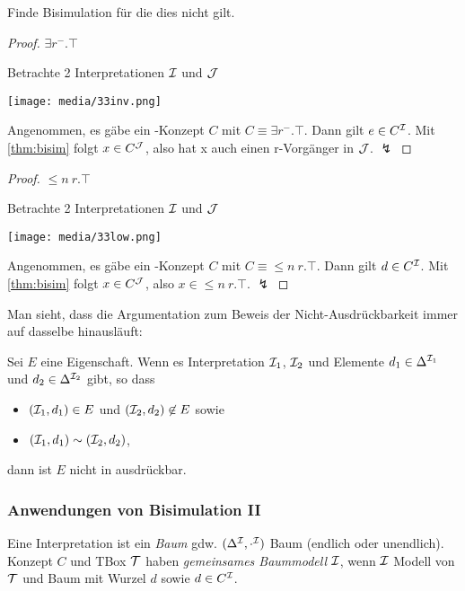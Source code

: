 \begin{tafel}[Beweisskizze] Finde Bisimulation für die dies nicht gilt.

\begin{proof} $\exists r^{-}.\top$

 Betrachte 2 Interpretationen $\mathcal{I}$ und $\mathcal{J}$

\texttt{[image: media/33inv.png]}

Angenommen, es gäbe ein \ALC-Konzept $C$ mit $C \equiv \exists r^{-}.\top$. Dann gilt $e \in C^{\mathcal{I}}$. Mit \autoref{thm:bisim} folgt $x \in C^{\mathcal{J}}$, also hat x auch einen r-Vorgänger in $\mathcal{J}$. $\lightning$
\end{proof} 

\begin{proof} $\leq n\ r.\top$

Betrachte 2 Interpretationen $\mathcal{I}$ und $\mathcal{J}$

\texttt{[image: media/33low.png]}

Angenommen, es gäbe ein \ALC-Konzept $C$ mit $C \equiv \leq n\ r.\top$. Dann gilt $d \in C^{\mathcal{I}}$. Mit \autoref{thm:bisim} folgt $x \in C^{\mathcal{J}}$, also $x \in \leq n\ r.\top$. $\lightning$
\end{proof}
\end{tafel}

Man sieht, dass die Argumentation zum Beweis der Nicht-Ausdrückbarkeit immer auf dasselbe hinausläuft:

\begin{theorem}
    \label{thm:alc-nicht-ausdruck}
Sei $E$ eine Eigenschaft. Wenn es Interpretation $\mathcal{I}_1$, $\mathcal{I}_2$
und Elemente $d_1 \in \Delta^{\mathcal{I}_1}$ und
$d_2 \in \Delta^{\mathcal{I}_2}$ gibt, so dass

\begin{itemize}
\item
  $\left( \MI_1,d_1 \right) \in E$ und
  $\left( \MI_2,d_2 \right) \not\in E$ sowie
\item
  $(\mathcal{I}_1,d_1) \sim (\mathcal{I}_2,d_2)$,
\end{itemize}

dann ist $E$ nicht in \ALC ausdrückbar.
\end{theorem}

\subsubsection{Anwendungen von Bisimulation II}

Eine Interpretation ist ein \emph{Baum} gdw. $(\Delta^{\mathcal{I}}, \cdot^{\mathcal{I}})$
Baum (endlich oder unendlich). Konzept $C$ und TBox $\mathcal{T}$ haben
\emph{gemeinsames Baummodell} $\mathcal{I}$, wenn $\mathcal{I}$ Modell von $\mathcal{T}$ und Baum mit
Wurzel $d$ sowie $d \in C^{\mathcal{I}}$.


